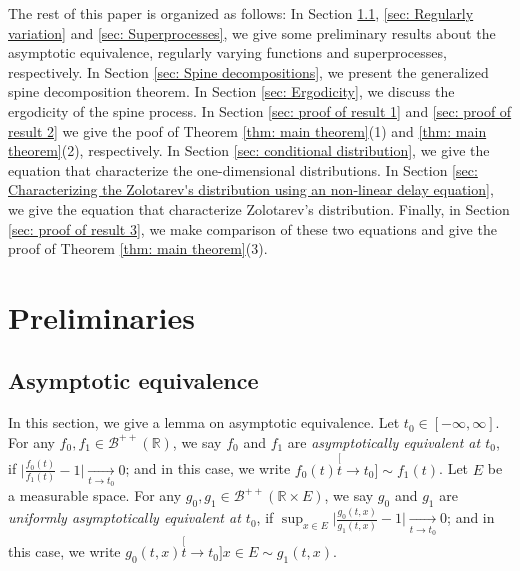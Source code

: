 \documentclass[12pt, a4paper]{amsart}
\theoremstyle{definition}
\numberwithin{equation}{section}
\begin{document}
	The rest of this paper is organized as follows:
	In Section \ref{sec: Asymptotic equivalence}, \ref{sec: Regularly variation} and \ref{sec: Superprocesses}, we give some preliminary results about the asymptotic equivalence, regularly varying functions and superprocesses, respectively.
	In Section \ref{sec: Spine decompositions}, we present the generalized spine decomposition theorem.
	In Section \ref{sec: Ergodicity}, we discuss the ergodicity of the spine process.
	In Section \ref{sec: proof of result 1} and \ref{sec: proof of result 2} we give the poof of Theorem \ref{thm: main theorem}(1) and \ref{thm: main theorem}(2), respectively.
	In Section \ref{sec: conditional distribution}, we give the equation that characterize the one-dimensional distributions.
	In Section \ref{sec: Characterizing the Zolotarev's distribution using an non-linear delay equation}, we give the equation that characterize Zolotarev's distribution.
	Finally, in Section \ref{sec: proof of result 3}, we make comparison of these two equations and give the proof of Theorem \ref{thm: main theorem}(3).

\newpage
\section{Preliminaries}
\label{sec: Preliminaries}

\subsection{Asymptotic equivalence}
\label{sec: Asymptotic equivalence}
	In this section, we give a lemma on asymptotic equivalence.	
	Let $t_0 \in [-\infty,\infty]$.
	For any $f_0, f_1\in \mathscr B^{++}({\mathbb R})$, we say $f_0$ and $f_1$ are \emph{asymptotically equivalent at $t_0$}, if $\big|\frac{f_0(t)}{f_1(t)} - 1\big| \xrightarrow[t\to t_0]{} 0$;
	and in this case, we write $f_0(t) \stackrel[t\to t_0]{}{\sim} f_1(t)$.
	Let $E$ be a measurable space.
	For any $g_0, g_1\in \mathscr B^{++}({\mathbb R\times E})$, we say $g_0$ and $g_1$ are \emph{uniformly asymptotically equivalent at $t_0$}, if $\sup_{x\in E}\big|\frac{g_0(t,x)}{g_1(t,x)} - 1\big| \xrightarrow[t\to t_0]{} 0$; and in this case, we write $g_0(t,x)\stackrel[t\to t_0]{x\in E}{\sim}g_1(t,x)$.
\end{document}
